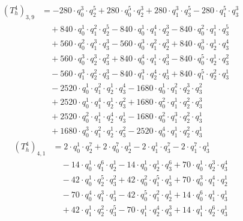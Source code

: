 \begin{align*}(T_{h}^4)_{3,9}&=-280\cdot q_0^{3}\cdot q_2^{5}+280\cdot q_0^{5}\cdot q_2^{3}+280\cdot q_1^{3}\cdot q_3^{5}-280\cdot q_1^{5}\cdot q_3^{3}\\
&\quad +840\cdot q_0^{1}\cdot q_1^{2}\cdot q_2^{5}-840\cdot q_0^{1}\cdot q_1^{4}\cdot q_2^{3}-840\cdot q_0^{2}\cdot q_1^{1}\cdot q_3^{5}\\
&\quad +560\cdot q_0^{2}\cdot q_1^{3}\cdot q_3^{3}-560\cdot q_0^{3}\cdot q_1^{2}\cdot q_2^{3}+840\cdot q_0^{3}\cdot q_2^{1}\cdot q_3^{4}\\
&\quad +560\cdot q_0^{3}\cdot q_2^{3}\cdot q_3^{2}+840\cdot q_0^{4}\cdot q_1^{1}\cdot q_3^{3}-840\cdot q_0^{5}\cdot q_2^{1}\cdot q_3^{2}\\
&\quad -560\cdot q_1^{3}\cdot q_2^{2}\cdot q_3^{3}-840\cdot q_1^{3}\cdot q_2^{4}\cdot q_3^{1}+840\cdot q_1^{5}\cdot q_2^{2}\cdot q_3^{1}\\
&\quad -2520\cdot q_0^{1}\cdot q_1^{2}\cdot q_2^{1}\cdot q_3^{4}-1680\cdot q_0^{1}\cdot q_1^{2}\cdot q_2^{3}\cdot q_3^{2}\\
&\quad +2520\cdot q_0^{1}\cdot q_1^{4}\cdot q_2^{1}\cdot q_3^{2}+1680\cdot q_0^{2}\cdot q_1^{1}\cdot q_2^{2}\cdot q_3^{3}\\
&\quad +2520\cdot q_0^{2}\cdot q_1^{1}\cdot q_2^{4}\cdot q_3^{1}-1680\cdot q_0^{2}\cdot q_1^{3}\cdot q_2^{2}\cdot q_3^{1}\\
&\quad +1680\cdot q_0^{3}\cdot q_1^{2}\cdot q_2^{1}\cdot q_3^{2}-2520\cdot q_0^{4}\cdot q_1^{1}\cdot q_2^{2}\cdot q_3^{1}\end{align*}
\begin{align*}(T_{h}^4)_{4,1}&=2\cdot q_0^{1}\cdot q_2^{7}+2\cdot q_0^{7}\cdot q_2^{1}-2\cdot q_1^{1}\cdot q_3^{7}-2\cdot q_1^{7}\cdot q_3^{1}\\
&\quad -14\cdot q_0^{1}\cdot q_1^{6}\cdot q_2^{1}-14\cdot q_0^{1}\cdot q_2^{1}\cdot q_3^{6}+70\cdot q_0^{1}\cdot q_2^{3}\cdot q_3^{4}\\
&\quad -42\cdot q_0^{1}\cdot q_2^{5}\cdot q_3^{2}+42\cdot q_0^{2}\cdot q_1^{5}\cdot q_3^{1}+70\cdot q_0^{3}\cdot q_1^{4}\cdot q_2^{1}\\
&\quad -70\cdot q_0^{4}\cdot q_1^{3}\cdot q_3^{1}-42\cdot q_0^{5}\cdot q_1^{2}\cdot q_2^{1}+14\cdot q_0^{6}\cdot q_1^{1}\cdot q_3^{1}\\
&\quad +42\cdot q_1^{1}\cdot q_2^{2}\cdot q_3^{5}-70\cdot q_1^{1}\cdot q_2^{4}\cdot q_3^{3}+14\cdot q_1^{1}\cdot q_2^{6}\cdot q_3^{1}\end{align*}
